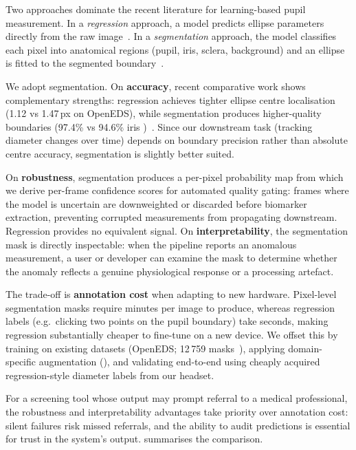 Two approaches dominate the recent literature for learning-based pupil measurement. In a \emph{regression} approach, a model predicts ellipse parameters directly from the raw image~\cite{kothari2021ellseg, jia2024condseg}. In a \emph{segmentation} approach, the model classifies each pixel into anatomical regions (pupil, iris, sclera, background) and an ellipse is fitted to the segmented boundary~\cite{chaudhary2019ritnet}.

We adopt segmentation. On \textbf{accuracy}, recent comparative work shows complementary strengths: regression achieves tighter ellipse centre localisation (1.12 vs 1.47\,px on OpenEDS), while segmentation produces higher-quality boundaries (97.4\% vs 94.6\% iris )~\cite{jia2024condseg, kothari2021ellseg}. Since our downstream task (tracking diameter changes over time) depends on boundary precision rather than absolute centre accuracy, segmentation is slightly better suited.

On \textbf{robustness}, segmentation produces a per-pixel probability map from which we derive per-frame confidence scores for automated quality gating: frames where the model is uncertain are downweighted or discarded before biomarker extraction, preventing corrupted measurements from propagating downstream. Regression provides no equivalent signal. On \textbf{interpretability}, the segmentation mask is directly inspectable: when the pipeline reports an anomalous  measurement, a user or developer can examine the mask to determine whether the anomaly reflects a genuine physiological response or a processing artefact.

The trade-off is \textbf{annotation cost} when adapting to new hardware. Pixel-level segmentation masks require minutes per image to produce, whereas regression labels (e.g.\ clicking two points on the pupil boundary) take seconds, making regression substantially cheaper to fine-tune on a new device. We offset this by training on existing datasets (OpenEDS; 12\,759 masks~\cite{garbin2019openeds}), applying domain-specific augmentation (), and validating end-to-end using cheaply acquired regression-style diameter labels from our headset.

For a screening tool whose output may prompt referral to a medical professional, the robustness and interpretability advantages take priority over annotation cost: silent failures risk missed referrals, and the ability to audit predictions is essential for trust in the system's output.  summarises the comparison.

